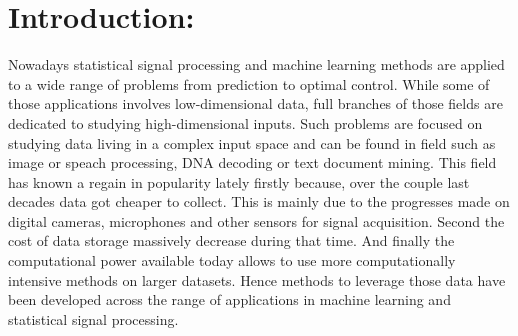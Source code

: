 \documentclass[a4paper,11pt]{report}
\begin{document}
	\vfill	
		
	\newpage
	\thispagestyle{empty}
	\mbox{}
 
	\renewcommand{\contentsname}{Contents:}
	\setcounter{tocdepth}{2}%
	\tableofcontents
	
	\clearpage

	\renewcommand{\listfigurename}{List of figures:}
	\listoffigures

\chapter{Introduction:}
	\label{chap:Intro}
	
	Nowadays statistical signal processing and machine learning methods are applied to a wide range of problems from prediction to optimal control. While some of those applications involves low-dimensional data, full branches of those fields are dedicated to studying high-dimensional inputs. Such problems are focused on studying data living in a complex input space and can be found in field such as image or speach processing, DNA decoding or text document mining. This field has known a regain in popularity lately firstly because, over the couple last decades data got cheaper to collect. This is mainly due to the progresses made on digital cameras, microphones and other sensors for signal acquisition. Second the cost of data storage massively decrease during that time. And finally the computational power available today allows to use more computationally intensive methods on larger datasets. Hence methods to leverage those data have been developed across the range of applications in machine learning and statistical signal processing.\\
	
\end{document}
